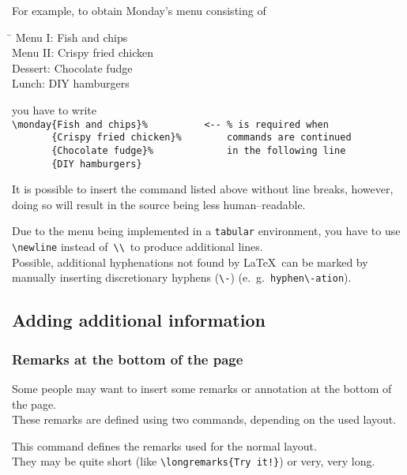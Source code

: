 \documentclass[11pt]{ltxdoc}
\begin{document}
	For example, to obtain Monday's menu consisting of
	\begin{multicols}{2}
		\begin{tabbing}
			\hspace{2cm}\=\kill
			Menu I:		\> Fish and chips \\
			Menu II:	\> Crispy fried chicken \\
			Dessert:	\> Chocolate fudge \\
			Lunch:		\> DIY hamburgers
		\end{tabbing}
	\end{multicols}
	you have to write \\
	\verb|\monday{Fish and chips}%          <-- % is required when| \\\nopagebreak[4]
	\verb|       {Crispy fried chicken}%        commands are continued| \\\nopagebreak[4]
	\verb|       {Chocolate fudge}%             in the following line| \\\nopagebreak[4]
	\verb|       {DIY hamburgers}|
	
	\smallskip
	It is possible to insert the command listed above without line breaks, however, doing so will result in the source being less human--readable.
	
	\smallskip
	Due to the menu being implemented in a \texttt{tabular} environment, you have to use \verb|\newline| instead of \,\verb|\\|\, to produce additional lines. \\
	Possible, additional hyphenations not found by \LaTeX\ can be marked by manually inserting discretionary hyphens (\verb|\-|) (e.~g.~\verb|hyphen\-ation|).
	
	
	\subsection{Adding additional information}
	\subsubsection{Remarks at the bottom of the page} \label{sec:remarks}
	Some people may want to insert some remarks or annotation at the bottom of the page. \\
	These remarks are defined using two commands, depending on the used layout.
	
	\medskip
	\DescribeMacro{\longremarks}
	This command defines the remarks used for the normal layout. \\
	They may be quite short (like \verb|\longremarks{Try it!}|) or very, very long.
	
\end{document}
